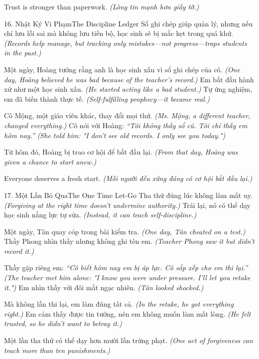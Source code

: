 \begin{ghinhoanh}
Trust is stronger than paperwork.
\textit{(Lòng tin mạnh hơn giấy tờ.)}
\end{ghinhoanh}

\begin{truyen}{16. Nhật Ký Vi Phạm}{The Discipline Ledger}
Sổ ghi chép giúp quản lý, nhưng nếu chỉ lưu lỗi sai mà không lưu tiến bộ, học sinh sẽ bị mắc kẹt trong quá khứ.
\textit{(Records help manage, but tracking only mistakes—not progress—traps students in the past.)}

Một ngày, Hoàng tưởng rằng anh là học sinh xấu vì sổ ghi chép của cô.
\textit{(One day, Hoàng believed he was bad because of the teacher's record.)}
Em bắt đầu hành xử như một học sinh xấu.
\textit{(He started acting like a bad student.)}
Tự ứng nghiệm, em đã biến thành thực tế.
\textit{(Self-fulfilling prophecy—it became real.)}

Cô Mộng, một giáo viên khác, thay đổi mọi thứ.
\textit{(Ms. Mộng, a different teacher, changed everything.)}
Cô nói với Hoàng: \textit{``Tôi không thấy sổ cũ. Tôi chỉ thấy em hôm nay.''}
\textit{(She told him: "I don't see old records. I only see you today.")}

Từ hôm đó, Hoàng bị trao cơ hội để bắt đầu lại.
\textit{(From that day, Hoàng was given a chance to start anew.)}
\end{truyen}

\begin{baihoc}
Everyone deserves a fresh start.
\textit{(Mỗi người đều xứng đáng có cơ hội bắt đầu lại.)}
\end{baihoc}

\begin{truyen}{17. Một Lần Bỏ Qua}{The One Time Let-Go}
Tha thứ đúng lúc không làm mất uy.
\textit{(Forgiving at the right time doesn't undermine authority.)}
Trái lại, nó có thể dạy học sinh nằng lực tự sửa.
\textit{(Instead, it can teach self-discipline.)}

Một ngày, Tân quay cóp trong bài kiểm tra.
\textit{(One day, Tân cheated on a test.)}
Thầy Phong nhìn thấy nhưng không ghi tên em.
\textit{(Teacher Phong saw it but didn't record it.)}

Thầy gặp riêng em: \textit{``Cô biết hôm nay em bị áp lực. Cô sắp xếp cho em thi lại.''}
\textit{(The teacher met him alone: "I know you were under pressure. I'll let you retake it.")}
Em nhìn thầy với đôi mắt ngạc nhiên.
\textit{(Tân looked shocked.)}

Mà không lần thi lại, em làm đúng tất cả.
\textit{(In the retake, he got everything right.)}
Em cảm thấy được tin tưởng, nên em không muốn làm mất lòng.
\textit{(He felt trusted, so he didn't want to betray it.)}

Một lần tha thứ có thể dạy hơn mười lần trừng phạt.
\textit{(One act of forgiveness can teach more than ten punishments.)}
\end{truyen}

